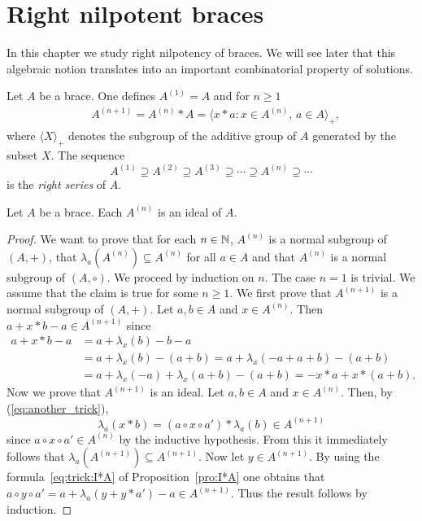 \chapter{Right nilpotent braces}

In this chapter we study right nilpotency of braces. 
We will see later that this algebraic notion translates into an important combinatorial 
property of solutions. 

\begin{definition}
Let $A$ be a brace. 
One defines
$A^{(1)}=A$ and for $n\geq1$
\begin{align*}
    & A^{(n+1)}=A^{(n)}*A=\langle x*a: x\in A^{(n)},\,a\in A\rangle_+,
\end{align*}
where $\langle X\rangle_+$ denotes the subgroup of the additive group of $A$
generated by the subset $X$.  The sequence 
\[
A^{(1)}\supseteq A^{(2)}\supseteq
A^{(3)}\supseteq\cdots\supseteq A^{(n)}\supseteq\cdots
\]
is the \emph{right series} of $A$.
\end{definition}

\begin{proposition}
    \label{pro:right_series}
    Let $A$ be a brace. Each $A^{(n)}$ is an ideal of $A$.
\end{proposition}

\begin{proof}
    We want to prove that for each $n\in\mathbb{N}$, $A^{(n)}$ is a normal subgroup of
    $(A,+)$, that $\lambda_a(A^{(n)})\subseteq A^{(n)}$ for all $a\in A$ and
    that $A^{(n)}$ is a normal subgroup of $(A,\circ)$. We proceed by induction on $n$.
    The case $n=1$ is trivial. We assume that the claim is true for some $n\geq1$.  We first prove that
    $A^{(n+1)}$ is a normal subgroup of $(A,+)$. Let $a,b\in A$ and $x\in
    A^{(n)}$. Then $a+x*b-a\in A^{(n+1)}$ since
    \begin{align*}
        a+x*b-a&=a+\lambda_x(b)-b-a\\
        &=a+\lambda_x(b)-(a+b)
        =a+\lambda_x(-a+a+b)-(a+b)\\
        &=a+\lambda_x(-a)+\lambda_x(a+b)-(a+b)
        =-x*a+x*(a+b).
    \end{align*}
    Now we prove that $A^{(n+1)}$ is an ideal.
    Let $a,b\in A$ and $x\in A^{(n)}$. Then, by (\ref{eq:another_trick}),
    \[\lambda_a(x*b)=(a\circ x\circ a')*\lambda_a(b)\in A^{(n+1)}\]
since $a\circ x\circ a'\in A^{(n)}$ by the inductive hypothesis.
From this it immediately follows that
$\lambda_a(A^{(n+1)})\subseteq A^{(n+1)}$.  Now let $y\in
A^{(n+1)}$. By using the formula~\eqref{eq:trick:I*A} of Proposition~\ref{pro:I*A} one obtains that
$a\circ y\circ a' =a+\lambda_a(y+y*a')-a\in A^{(n+1)}$. Thus
the result follows by induction.
\end{proof}

